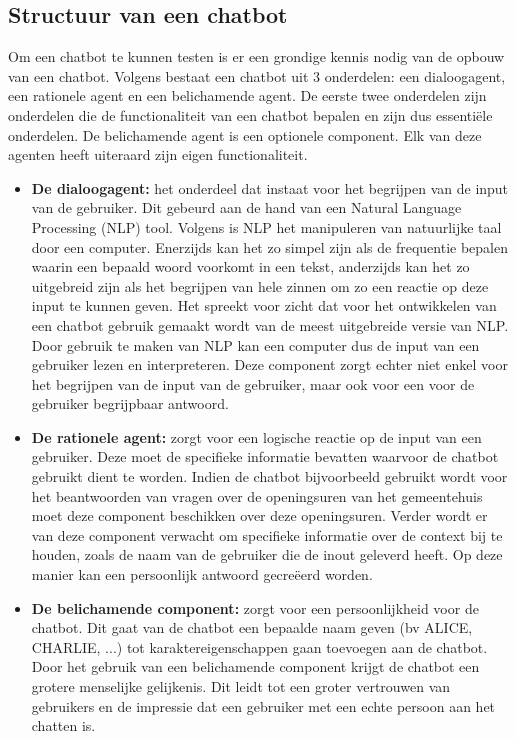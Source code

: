 \subsection{Structuur van een chatbot}

Om een chatbot te kunnen testen is er een grondige kennis nodig van de opbouw van een chatbot. Volgens \textcite{Cahn2017} bestaat een chatbot uit 3 onderdelen: een dialoogagent, een rationele agent en een belichamende agent. De eerste twee onderdelen zijn onderdelen die de functionaliteit van een chatbot bepalen en zijn dus essentiële onderdelen. De belichamende agent is een optionele component. Elk van deze agenten heeft uiteraard zijn eigen functionaliteit. 

\begin{itemize}

\item \textbf{De dialoogagent:} het onderdeel dat instaat voor het begrijpen van de input van de gebruiker. Dit gebeurd aan de hand van een Natural Language Processing (NLP) tool. Volgens \textcite{Bird2009} is NLP het manipuleren van natuurlijke taal door een computer. Enerzijds kan het zo simpel zijn als de frequentie bepalen waarin een bepaald woord voorkomt in een tekst, anderzijds kan het zo uitgebreid zijn als het begrijpen van hele zinnen om zo een reactie op deze input te kunnen geven. Het spreekt voor zicht dat voor het ontwikkelen van een chatbot gebruik gemaakt wordt van de meest uitgebreide versie van NLP. Door gebruik te maken van NLP kan een computer dus de input van een gebruiker lezen en interpreteren. Deze component zorgt echter niet enkel voor het begrijpen van de input van de gebruiker, maar ook voor een voor de gebruiker begrijpbaar antwoord. 

\item \textbf{De rationele agent:} zorgt voor een logische reactie op de input van een gebruiker. Deze moet de specifieke informatie bevatten waarvoor de chatbot gebruikt dient te worden. Indien de chatbot bijvoorbeeld gebruikt wordt voor het beantwoorden van vragen over de openingsuren van het gemeentehuis moet deze component beschikken over deze openingsuren. Verder wordt er van deze component verwacht om specifieke informatie over de context bij te houden, zoals de naam van de gebruiker die de inout geleverd heeft. Op deze manier kan een persoonlijk antwoord gecreëerd worden.


\item \textbf{De belichamende component:} zorgt voor een persoonlijkheid voor de chatbot. Dit gaat van de chatbot een bepaalde naam geven (bv ALICE, CHARLIE, ...) tot karaktereigenschappen gaan toevoegen aan de chatbot. Door het gebruik van een belichamende component krijgt de chatbot een grotere menselijke gelijkenis. Dit leidt tot een groter vertrouwen van gebruikers en de impressie dat een gebruiker met een echte persoon aan het chatten is.

\end{itemize}

